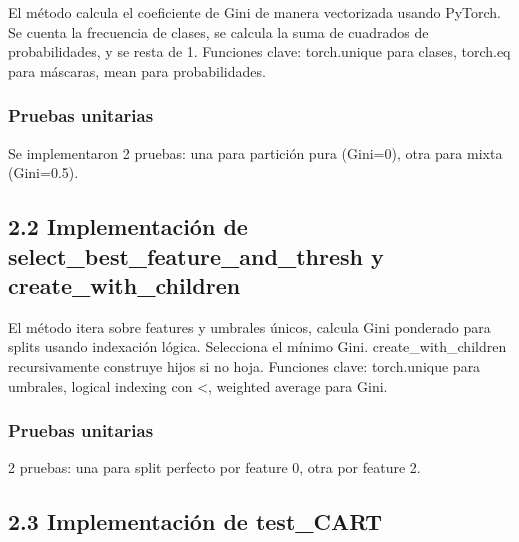 \documentclass{article}
\begin{document}


El método calcula el coeficiente de Gini de manera vectorizada usando PyTorch. Se cuenta la frecuencia de clases, se calcula la suma de cuadrados de probabilidades, y se resta de 1. Funciones clave: torch.unique para clases, torch.eq para máscaras, mean para probabilidades.

\subsubsection{Pruebas unitarias}

Se implementaron 2 pruebas: una para partición pura (Gini=0), otra para mixta (Gini=0.5).



\subsection{2.2 Implementación de select\_best\_feature\_and\_thresh y create\_with\_children}



El método itera sobre features y umbrales únicos, calcula Gini ponderado para splits usando indexación lógica. Selecciona el mínimo Gini. create\_with\_children recursivamente construye hijos si no hoja. Funciones clave: torch.unique para umbrales, logical indexing con <, weighted average para Gini.

\subsubsection{Pruebas unitarias}

2 pruebas: una para split perfecto por feature 0, otra por feature 2.



\subsection{2.3 Implementación de test\_CART}


\end{document}
